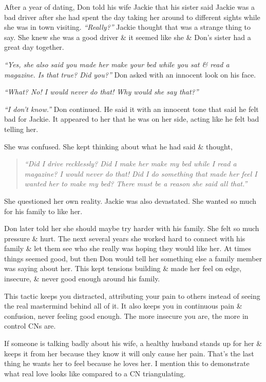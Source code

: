 \documentclass{article}
\numberwithin{equation}{section}
\begin{document}
After a year of dating, Don told his wife Jackie that his sister said Jackie was a bad driver after she had spent the day taking her around to different sights while she was in town visiting. \textit{``Really?''} Jackie thought that was a strange thing to say. She knew she was a good driver \& it seemed like she \& Don's sister had a great day together.

\textit{``Yes, she also said you made her make your bed while you sat \& read a magazine. Is that true? Did you?''} Don asked with an innocent look on his face.

\textit{``What? No! I would never do that! Why would she say that?''}

\textit{``I don't know.''} Don continued. He said it with an innocent tone that said he felt bad for Jackie. It appeared to her that he was on her side, acting like he felt bad telling her.

She was confused. She kept thinking about what he had said \& thought,
\begin{quotation}\it
	``Did I drive recklessly? Did I make her make my bed while I read a magazine? I would never do that! Did I do something that made her feel I wanted her to make my bed? There must be a reason she said all that.''
\end{quotation}
She questioned her own reality. Jackie was also devastated. She wanted so much for his family to like her.

Don later told her she should maybe try harder with his family. She felt so much pressure \& hurt. The next several years she worked hard to connect with his family \& let them see who she really was hoping they would like her. At times things seemed good, but then Don would tell her something else a family member was saying about her. This kept tensions building \& made her feel on edge, insecure, \& never good enough around his family.

This tactic keeps you distracted, attributing your pain to others instead of seeing the real mastermind behind all of it. It also keeps you in continuous pain \& confusion, never feeling good enough. The more insecure you are, the more in control CNs are.

If someone is talking badly about his wife, a healthy husband stands up for her \& keeps it from her because they know it will only cause her pain. That's the last thing he wants her to feel because he loves her. I mention this to demonstrate what real love looks like compared to a CN triangulating.
\end{document}
